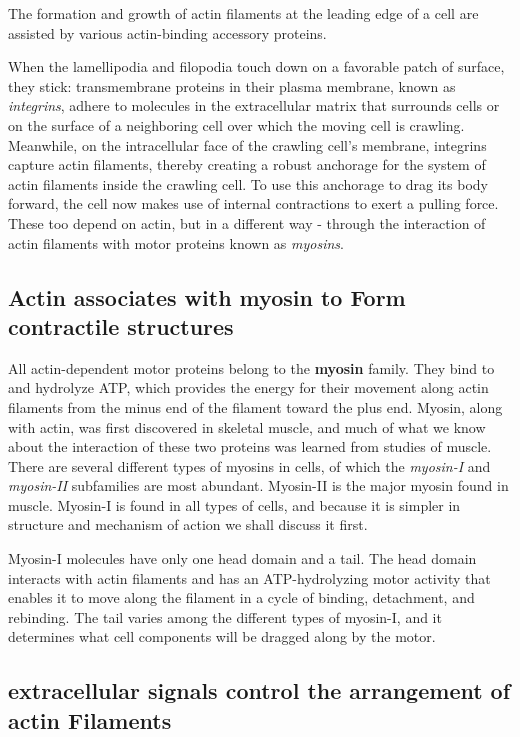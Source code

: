 The formation and growth of actin filaments at the leading edge of a
cell are assisted by various actin-binding accessory proteins.

When the lamellipodia and filopodia touch down on a favorable patch of
surface, they stick: transmembrane proteins in their plasma membrane,
known as \textit{integrins}, adhere to molecules in the extracellular matrix that
surrounds cells or on the surface of a neighboring cell over which the
moving cell is crawling. Meanwhile, on the intracellular face of the crawling
cell’s membrane, integrins capture actin filaments, thereby creating a
robust anchorage for the system of actin filaments inside the crawling cell.
To use this anchorage to drag its body forward, the
cell now makes use of internal contractions to exert a pulling force.
These too depend on actin, but in a different way - through
the interaction of actin filaments with motor proteins known as \textit{myosins}.

\subsection{Actin associates with myosin to Form contractile structures}

All actin-dependent motor proteins belong to the \textbf{myosin} family. They
bind to and hydrolyze ATP, which provides the energy for their movement
along actin filaments from the minus end of the filament toward the plus
end. Myosin, along with actin, was first discovered in skeletal muscle,
and much of what we know about the interaction of these two proteins
was learned from studies of muscle. There are several different types
of myosins in cells, of which the \textit{myosin-I} and \textit{myosin-II} subfamilies are
most abundant. Myosin-II is the major myosin found in muscle. Myosin-I
is found in all types of cells, and because it is simpler in structure and
mechanism of action we shall discuss it first.

Myosin-I molecules have only one head domain and a tail.
The head domain interacts with actin filaments and has an ATP-hydrolyzing
motor activity that enables it to move along the filament in
a cycle of binding, detachment, and rebinding. The tail varies
among the different types of myosin-I, and it determines what cell
components will be dragged along by the motor.

\subsection{extracellular signals control the arrangement of actin Filaments}

